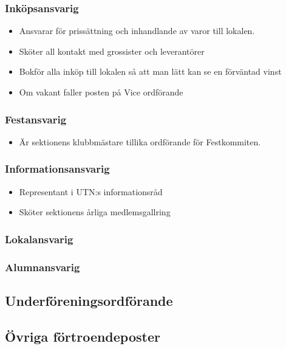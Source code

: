 \documentclass{../resources/dgovdoc}
\begin{document}
\subsubsection{Inköpsansvarig}

\begin{itemize}
\item Ansvarar för prissättning och inhandlande av varor till lokalen. 
\item Sköter all kontakt med grossister och leverantörer
\item Bokför alla inköp till lokalen så att man lätt kan se en förväntad vinst
\item Om vakant faller posten på Vice ordförande
\end{itemize}

\subsubsection{Festansvarig}

\begin{itemize}
	\item Är sektionens klubbmästare tillika ordförande för Festkommiten.
\end{itemize}

\subsubsection{Informationsansvarig}

\begin{itemize}
	\item Representant i UTN:s informationsråd
	\item Sköter sektionens årliga medlemsgallring
\end{itemize}

\subsubsection{Lokalansvarig}

\subsubsection{Alumnansvarig}

\subsection{Underföreningsordförande}

\subsection{Övriga förtroendeposter}
\end{document}
